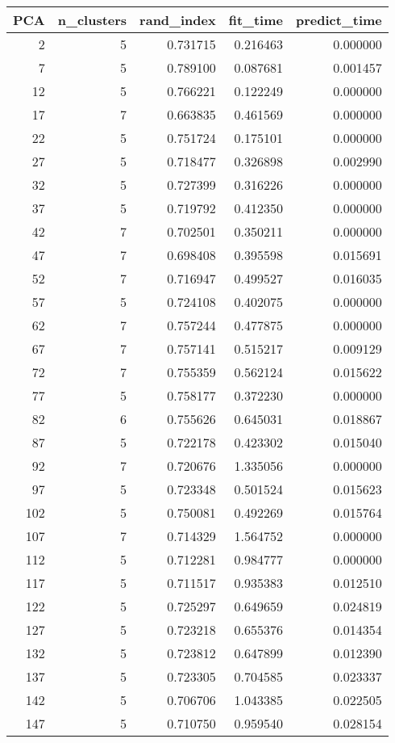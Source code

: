 \begin{tabular}{rrrrr}
\toprule
PCA & n_clusters & rand_index & fit_time & predict_time \\
\midrule
2 & 5 & 0.731715 & 0.216463 & 0.000000 \\
7 & 5 & 0.789100 & 0.087681 & 0.001457 \\
12 & 5 & 0.766221 & 0.122249 & 0.000000 \\
17 & 7 & 0.663835 & 0.461569 & 0.000000 \\
22 & 5 & 0.751724 & 0.175101 & 0.000000 \\
27 & 5 & 0.718477 & 0.326898 & 0.002990 \\
32 & 5 & 0.727399 & 0.316226 & 0.000000 \\
37 & 5 & 0.719792 & 0.412350 & 0.000000 \\
42 & 7 & 0.702501 & 0.350211 & 0.000000 \\
47 & 7 & 0.698408 & 0.395598 & 0.015691 \\
52 & 7 & 0.716947 & 0.499527 & 0.016035 \\
57 & 5 & 0.724108 & 0.402075 & 0.000000 \\
62 & 7 & 0.757244 & 0.477875 & 0.000000 \\
67 & 7 & 0.757141 & 0.515217 & 0.009129 \\
72 & 7 & 0.755359 & 0.562124 & 0.015622 \\
77 & 5 & 0.758177 & 0.372230 & 0.000000 \\
82 & 6 & 0.755626 & 0.645031 & 0.018867 \\
87 & 5 & 0.722178 & 0.423302 & 0.015040 \\
92 & 7 & 0.720676 & 1.335056 & 0.000000 \\
97 & 5 & 0.723348 & 0.501524 & 0.015623 \\
102 & 5 & 0.750081 & 0.492269 & 0.015764 \\
107 & 7 & 0.714329 & 1.564752 & 0.000000 \\
112 & 5 & 0.712281 & 0.984777 & 0.000000 \\
117 & 5 & 0.711517 & 0.935383 & 0.012510 \\
122 & 5 & 0.725297 & 0.649659 & 0.024819 \\
127 & 5 & 0.723218 & 0.655376 & 0.014354 \\
132 & 5 & 0.723812 & 0.647899 & 0.012390 \\
137 & 5 & 0.723305 & 0.704585 & 0.023337 \\
142 & 5 & 0.706706 & 1.043385 & 0.022505 \\
147 & 5 & 0.710750 & 0.959540 & 0.028154 \\

\end{tabular}
